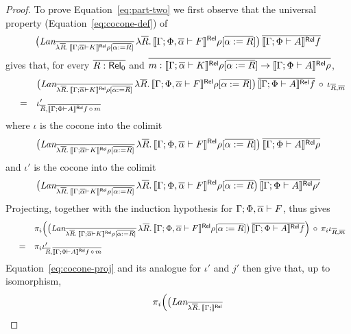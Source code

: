 \documentclass{lmcs}
\theoremstyle{plain}\newtheorem{satz}[thm]{Satz}
\begin{document}
{\begin{proof}
\vspace*{0.1in}

To prove Equation~\ref{eq:part-two} we first observe that 
  the universal property (Equation~\ref{eq:cocone-def}) of 
\[
\big(\textit{Lan}_{\overline{\lambda \overline{R}.\,\llbracket{\Gamma; \overline{\alpha}
      \vdash K}\rrbracket^{\mathsf{Rel}}\rho[\overline{\alpha := R}]}}\, \lambda
\overline{R}.\,\llbracket{\Gamma; \Phi, \overline{\alpha} \vdash F}\rrbracket^{\mathsf{Rel}}\rho[\overline{\alpha :=
    R}]\big)\, \overline{\llbracket{\Gamma; \Phi \vdash A}\rrbracket^{\mathsf{Rel}}f}
\] gives that,
for every $\overline{R : \mathsf{Rel}_0}$ and $\overline{m : \llbracket{\Gamma; \overline{\alpha}
    \vdash K}\rrbracket^{\mathsf{Rel}}\rho[\overline{\alpha := R}] \to \llbracket{\Gamma; \Phi \vdash
    A}\rrbracket^{\mathsf{Rel}}\rho}$, 
\[\begin{array}{lll}
 & & \big(\textit{Lan}_{\overline{\lambda \overline{R}.\,\llbracket{\Gamma; \overline{\alpha}
      \vdash K}\rrbracket^{\mathsf{Rel}}\rho[\overline{\alpha := R}]}}\, \lambda
\overline{R}.\,\llbracket{\Gamma; \Phi, \overline{\alpha} \vdash F}\rrbracket^{\mathsf{Rel}}\rho[\overline{\alpha :=
    R}]\big)\, \overline{\llbracket{\Gamma; \Phi \vdash A}\rrbracket^{\mathsf{Rel}}f} \,\circ\,
\iota_{\overline{R}, \overline{m}}\\[2ex]
& = & \iota'_{\overline{R}, \overline{\llbracket{\Gamma; \Phi \vdash A}\rrbracket^{\mathsf{Rel}}f \,\circ\,
    m}}
\end{array}\]
where $\iota$ is the cocone into the colimit
\[
\big(\textit{Lan}_{\overline{\lambda \overline{R}.\,\llbracket{\Gamma; \overline{\alpha}
      \vdash K}\rrbracket^{\mathsf{Rel}}\rho[\overline{\alpha := R}]}}\, \lambda
\overline{R}.\,\llbracket{\Gamma; \Phi, \overline{\alpha} \vdash F}\rrbracket^{\mathsf{Rel}}\rho[\overline{\alpha :=
    R}]\big)\, \overline{\llbracket{\Gamma; \Phi \vdash A}\rrbracket^{\mathsf{Rel}}\rho}
\]
and $\iota'$ is the cocone into the colimit
\[\big(\textit{Lan}_{\overline{\lambda \overline{R}.\,\llbracket{\Gamma; \overline{\alpha}
 \vdash K}\rrbracket^{\mathsf{Rel}}\rho[\overline{\alpha := R}]}}\, \lambda \overline{R}.\,\llbracket{\Gamma;
  \Phi, \overline{\alpha} \vdash F}\rrbracket^{\mathsf{Rel}}\rho[\overline{\alpha := R}\big)\,
  \overline{\llbracket{\Gamma; \Phi \vdash A}\rrbracket^{\mathsf{Rel}}\rho'}
\]
Projecting, together with the induction hypothesis for
$\Gamma;\Phi,\overline{\alpha}\vdash F$, thus gives
\[\begin{array}{lll}
 & & \pi_i \Big( \big(\textit{Lan}_{\overline{\lambda
    \overline{R}.\,\llbracket{\Gamma; \overline{\alpha} 
    \vdash K}\rrbracket^{\mathsf{Rel}}\rho[\overline{\alpha := R}]}}\,  
    \lambda \overline{R}.\,\llbracket{\Gamma; \Phi, \overline{\alpha} \vdash
      F}\rrbracket^{\mathsf{Rel}}\rho[\overline{\alpha := R}]\big)\, 
    \overline{\llbracket{\Gamma; \Phi \vdash A}\rrbracket^{\mathsf{Rel}}f} \Big)
\,\circ\, \pi_i \iota_{\overline{R}, \overline{m}} \\[2ex]
& = & \pi_i \iota'_{\overline{R}, \overline{\llbracket{\Gamma; \Phi \vdash A}\rrbracket^{\mathsf{Rel}}f \,\circ\,
    m}} 
\end{array}\]
Equation~\ref{eq:cocone-proj} and its analogue for
  $\iota'$ and $j'$ then give that, up to isomorphism,
\[\begin{array}{lll}
 & & \pi_i \Big( \big(\textit{Lan}_{\overline{\lambda \overline{R}.\,\llbracket{\Gamma;
}\rrbracket^{\mathsf{Rel}}}}
\end{array}\]
\end{proof}}
\end{document}
